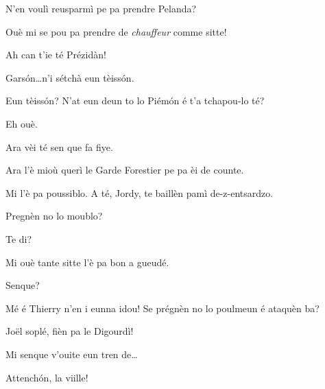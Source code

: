 \begin{drama}
\Jordyspeaks N'en voulì reusparmì pe pa prendre Pelanda? 

\Joelspeaks Ouè mi se pou pa prendre de \textit{chauffeur} comme sitte!

\Thierryspeaks{} Ah can t'ie té Prézidàn!


\Chauffeurspeaks Gars\'on\ldots n'i sétchà eun tèiss\'on.

\Joelspeaks Eun tèiss\'on? N'at eun deun to lo Piém\'on é t'a tchapou-lo té?

\Chauffeurspeaks Eh ouè.

\Joelspeaks Ara vèi té sen que fa fiye.

\Chauffeurspeaks Ara l'è mioù querì le Garde Forestier pe pa èi de counte.


\Joelspeaks Mi l'è pa poussiblo. A té, Jordy, te baillèn pamì de-z-entsardzo.

\Thierryspeaks{} Pregnèn no lo moublo?

\Joelspeaks Te di?

\Thierryspeaks  Mi ouè tante sitte l'è pa bon a gueudé.

\Jordyspeaks Senque?

\Joelspeaks{} Mé é Thierry n'en i eunna idou! Se prégnèn no lo poulmeun é ataquèn ba?


\Joellespeaks{} Jo\"{e}l soplé, fièn pa le Digourdì!


\Chauffeurspeaks Mi senque v'ouite eun tren de\ldots





\Joellespeaks{} Attench\'on, la viille!


\end{drama}
